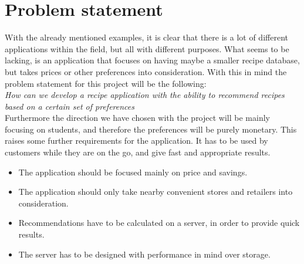 \section{Problem statement}
\label{sec:probstate}

With the already mentioned examples, it is clear that there is a lot of different applications within the field, but all with different purposes. What seems to be lacking, is an application that focuses on having maybe a smaller recipe database, but takes prices or other preferences into consideration. With this in mind the problem statement for this project will be the following: \\


\emph{How can we develop a recipe application with the ability to recommend recipes based on a certain set of preferences} \\


Furthermore the direction we have chosen with the project will be mainly focusing on students, and therefore the preferences will be purely monetary. This raises some further requirements for the application. It has to be used by customers while they are on the go, and give fast and appropriate results.

\begin{itemize}
\item The application should be focused mainly on price and savings.
\item The application should only take nearby convenient stores and retailers into consideration.
\item Recommendations have to be calculated on a server, in order to provide quick results.
\item The server has to be designed with performance in mind over storage.
\end{itemize}



